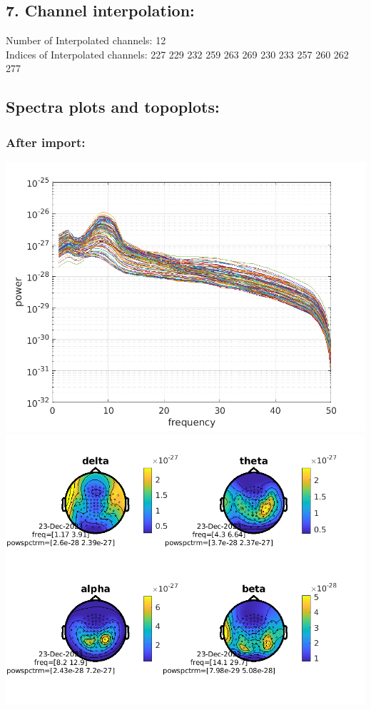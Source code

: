 \documentclass[10pt,a4paper,oneside]{report}
\begin{document}
\subsection*{7. Channel interpolation:}
Number of Interpolated channels: 12 
\\ Indices of Interpolated channels: 227  229  232  259  263  269  230  233  257  260  262  277 
\subsection*{ Spectra plots and topoplots:}
\subsubsection*{After import:}
 \includegraphics[width=14cm]{spectrum_after_import_mag.png}\\
 \includegraphics[width=14cm]{topo_after_import_mag.png}\\
\end{document}
